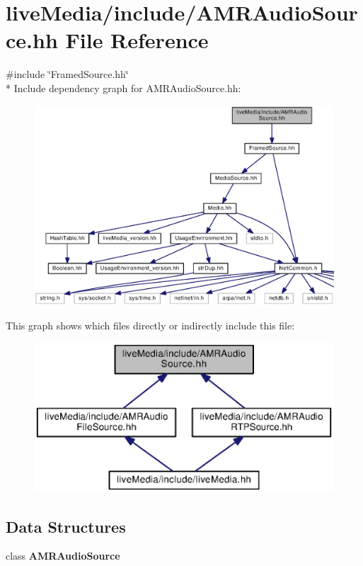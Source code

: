 \section{live\+Media/include/\+A\+M\+R\+Audio\+Source.hh File Reference}
\label{AMRAudioSource_8hh}
{\ttfamily \#include \char`\"{}Framed\+Source.\+hh\char`\"{}}\\*
Include dependency graph for A\+M\+R\+Audio\+Source.\+hh\+:
\nopagebreak
\begin{figure}[H]
\begin{center}
\leavevmode
\includegraphics[width=350pt]{AMRAudioSource_8hh__incl}
\end{center}
\end{figure}
This graph shows which files directly or indirectly include this file\+:
\nopagebreak
\begin{figure}[H]
\begin{center}
\leavevmode
\includegraphics[width=350pt]{AMRAudioSource_8hh__dep__incl}
\end{center}
\end{figure}
\subsection*{Data Structures}
\begin{DoxyCompactItemize}
\item 
class {\bf A\+M\+R\+Audio\+Source}
\end{DoxyCompactItemize}
